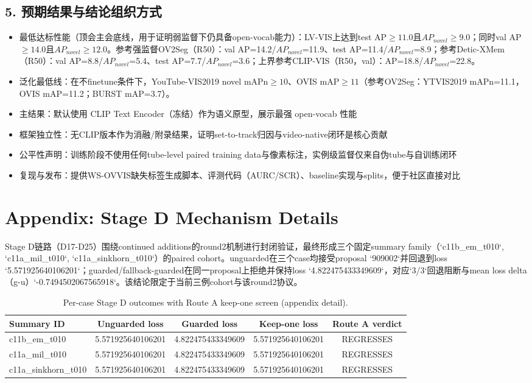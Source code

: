 \documentclass[UTF8]{ctexart}
\begin{document}
\par\noindent\hrulefill\par


\subsection*{5. 预期结果与结论组织方式}
\begin{itemize}
\item 最低达标性能（顶会主会底线，用于证明弱监督下仍具备open-vocab能力）：LV-VIS上达到test AP$\ge 11.0$且$AP_{novel}\ge 9.0$；同时val AP$\ge 14.0$且$AP_{novel}\ge 12.0$。参考强监督OV2Seg（R50）：val AP=14.2/$AP_{novel}$=11.9、test AP=11.4/$AP_{novel}$=8.9；参考Detic-XMem（R50）：val AP=8.8/$AP_{novel}$=5.4、test AP=7.7/$AP_{novel}$=3.6；上界参考CLIP-VIS（R50，val）：AP=18.8/$AP_{novel}$=22.8。
\item 泛化最低线：在不finetune条件下，YouTube-VIS2019 novel mAPn$\ge 10$、OVIS mAP$\ge 11$（参考OV2Seg：YTVIS2019 mAPn=11.1，OVIS mAP=11.2；BURST mAP=3.7）。
\item 主结果：默认使用 CLIP Text Encoder（冻结）作为语义原型，展示最强 open-vocab 性能
\item 框架独立性：无CLIP版本作为消融/附录结果，证明set-to-track归因与video-native闭环是核心贡献
\item 公平性声明：训练阶段不使用任何tube-level paired training data与像素标注，实例级监督仅来自伪tube与自训练闭环
\item 复现与发布：提供WS-OVVIS缺失标签生成脚本、评测代码（AURC/SCR）、baseline实现与splits，便于社区直接对比
\end{itemize}

\appendix
\section*{Appendix: Stage D Mechanism Details}

Stage D链路（D17-D25）围绕continued additions的round2机制进行封闭验证，最终形成三个固定summary family（`c11b_em_t010`, `c11a_mil_t010`, `c11a_sinkhorn_t010`）的paired cohort。unguarded在三个case均接受proposal `909002`并回退到loss `5.571925640106201`；guarded/fallback-guarded在同一proposal上拒绝并保持loss `4.822475433349609`，对应`3/3`回退阻断与mean loss delta（g-u）`-0.7494502067565918`。该结论限定于当前三例cohort与该round2协议。

\begin{table}[htbp]
\centering
\caption{Per-case Stage D outcomes with Route A keep-one screen (appendix detail).}
\label{tab:stage_d_appendix_per_case}
\begin{tabular}{lcccc}
\hline
Summary ID & Unguarded loss & Guarded loss & Keep-one loss & Route A verdict \\
\hline
c11b\_em\_t010 & 5.571925640106201 & 4.822475433349609 & 5.571925640106201 & REGRESSES \\
c11a\_mil\_t010 & 5.571925640106201 & 4.822475433349609 & 5.571925640106201 & REGRESSES \\
c11a\_sinkhorn\_t010 & 5.571925640106201 & 4.822475433349609 & 5.571925640106201 & REGRESSES \\
\hline
\end{tabular}
\end{table}
\end{document}
